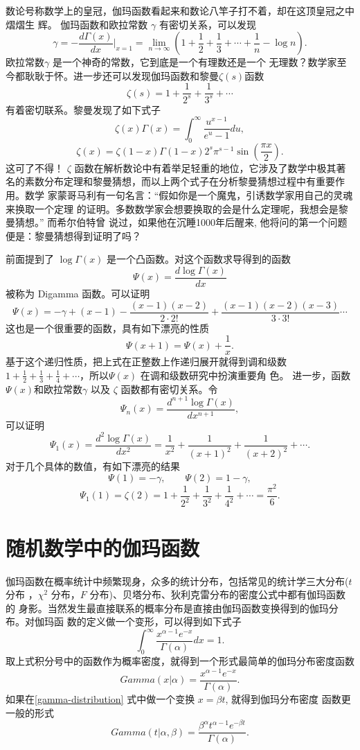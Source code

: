 {数论号称数学上的皇冠，伽玛函数看起来和数论八竿子打不着，却在这顶皇冠之中熠熠生
辉。 伽玛函数和欧拉常数 $\gamma$ 有密切关系，可以发现
$$ \gamma = -\frac{d\Gamma(x)}{dx}|_{x=1} =
\lim_{n\rightarrow \infty}(1+\frac{1}{2} + \frac{1}{3}+\cdots+\frac{1}{n} - \log n) . $$
欧拉常数$\gamma$ 是一个神奇的常数，它到底是一个有理数还是一个
无理数？数学家至今都耿耿于怀。进一步还可以发现伽玛函数和黎曼$\zeta(s)$函数
$$ \zeta(s) = 1+\frac{1}{2^s} + \frac{1}{3^s} + \cdots $$
有着密切联系。黎曼发现了如下式子
$$ \zeta(x) \Gamma(x) = \int_0^\infty \frac{u^{x-1}}{e^u - 1} du ,$$
$$ \zeta(x) = \zeta(1-x) \Gamma(1-x) 2^s \pi^{s-1} \sin\left(\frac{\pi x}{2}\right)  .$$
这可了不得！ $\zeta$ 函数在解析数论中有着举足轻重的地位，它涉及了数学中极其著
名的素数分布定理和黎曼猜想，而以上两个式子在分析黎曼猜想过程中有重要作用。数学
家蒙哥马利有一句名言：“假如你是一个魔鬼，引诱数学家用自己的灵魂来换取一个定理
的证明。多数数学家会想要换取的会是什么定理呢，我想会是黎曼猜想。” 而希尔伯特曾
说过，如果他在沉睡1000年后醒来, 他将问的第一个问题便是：黎曼猜想得到证明了吗？

前面提到了 $\log\Gamma(x)$ 是一个凸函数。对这个函数求导得到的函数
$$ \Psi(x) = \frac{d\log\Gamma(x)}{dx}  $$
被称为 Digamma 函数。可以证明
$$\Psi(x) = -\gamma + (x-1) - \frac{(x-1)(x-2)}{2\cdot 2!} 
+ \frac{(x-1)(x-2)(x-3)}{3\cdot 3!} \cdots $$
这也是一个很重要的函数，具有如下漂亮的性质
$$ \Psi(x+1) = \Psi(x) + \frac{1}{x} .$$
基于这个递归性质，把上式在正整数上作递归展开就得到调和级数 $1+\frac{1}{2} +
\frac{1}{3} + \frac{1}{4} + \cdots $，所以$\Psi(x)$ 在调和级数研究中扮演重要角
色。 进一步，函数$\Psi(x)$和欧拉常数$\gamma$ 以及 $\zeta$ 函数都有密切关系。令
$$ \Psi_n(x) = \frac{d^{n+1}\log\Gamma(x)}{dx^{n+1}} ,$$
可以证明
$$\Psi_1(x) = \frac{d^{2}\log\Gamma(x)}{dx^{2}}
= \frac{1}{x^2} + \frac{1}{(x+1)^2} + \frac{1}{(x+2)^2} + \cdots .$$
对于几个具体的数值，有如下漂亮的结果
$$\Psi(1) = -\gamma, \quad \quad \Psi(2) = 1-\gamma ,$$
$$\Psi_1(1) = \zeta(2) = 1 + \frac{1}{2^2} + \frac{1}{3^2} + \frac{1}{4^2} +  \cdots 
= \frac{\pi^2}{6} .$$


\section{随机数学中的伽玛函数}

伽玛函数在概率统计中频繁现身，众多的统计分布，包括常见的统计学三大分布($t$ 分布
，$\chi^2$ 分布，$F$ 分布)、贝塔分布、狄利克雷分布的密度公式中都有伽玛函数的
身影。当然发生最直接联系的概率分布是直接由伽玛函数变换得到的伽玛分布。对伽玛函
数的定义做一个变形，可以得到如下式子
\begin{equation}
\label{gamma-distribution}
\int_0^{\infty} \frac{x^{\alpha-1}e^{-x}}{\Gamma(\alpha)}dx = 1 .
\end{equation}
取上式积分号中的函数作为概率密度，就得到一个形式最简单的伽玛分布密度函数
$$Gamma(x|\alpha) = \frac{x^{\alpha-1}e^{-x}}{\Gamma(\alpha)} .$$
如果在\eqref{gamma-distribution} 式中做一个变换 $x=\beta t$, 就得到伽玛分布密度
函数更一般的形式
$$Gamma(t|\alpha, \beta) = \frac{\beta^\alpha t^{\alpha-1}e^{-\beta t}}{\Gamma(\alpha)} .$$

}
